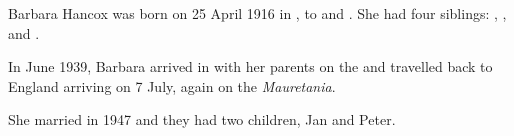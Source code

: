 
Barbara Hancox was born on 25 April 1916 in ,  to  and \cite{BarbaraHancoxBirth}.
She had four siblings: , ,  and .

In June 1939, Barbara arrived in  with her parents on the \emph{}
and travelled back to England arriving on 7 July, again on the \emph{Mauretania}.\cite{BarbaraHancoxTravel}

She married  in 1947 and they had two children, Jan and Peter.
